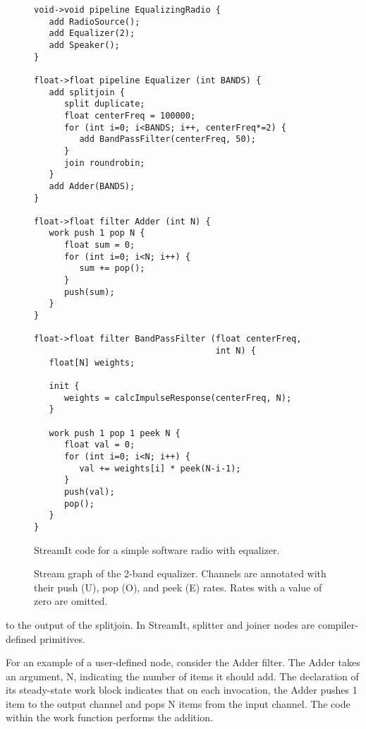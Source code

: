 \begin{figure}[h]
\scriptsize
\begin{minipage}{3in}
\vspace{6pt}
\begin{verbatim}
void->void pipeline EqualizingRadio {
   add RadioSource();
   add Equalizer(2);
   add Speaker();
}

float->float pipeline Equalizer (int BANDS) {
   add splitjoin {
      split duplicate;
      float centerFreq = 100000;
      for (int i=0; i<BANDS; i++, centerFreq*=2) {
         add BandPassFilter(centerFreq, 50);
      }
      join roundrobin;
   }
   add Adder(BANDS);
}

float->float filter Adder (int N) {
   work push 1 pop N {
      float sum = 0;
      for (int i=0; i<N; i++) {
         sum += pop();
      }
      push(sum);
   }
}

float->float filter BandPassFilter (float centerFreq, 
                                    int N) {
   float[N] weights;

   init {
      weights = calcImpulseResponse(centerFreq, N);
   }

   work push 1 pop 1 peek N {
      float val = 0;
      for (int i=0; i<N; i++) {
         val += weights[i] * peek(N-i-1);
      }
      push(val);
      pop();
   }
}
\end{verbatim}
\vspace{-6pt}
\parbox{2.7in}{\caption{StreamIt code for a simple software radio with equalizer.
\protect\label{fig:eq-code}}}
\end{minipage}
\hspace{0.3in}
\begin{minipage}{3.2in}
\vspace{12pt}
\caption{Stream graph of the 2-band equalizer.  Channels are annotated
with their push (U), pop (O), and peek (E) rates.  Rates with a value
of zero are omitted. \protect\label{fig:eq-graph}}
\end{minipage}
\end{figure}

\clearpage \noindent 
to the output of the splitjoin.  In StreamIt, splitter and joiner
nodes are compiler-defined primitives.

For an example of a user-defined node, consider the Adder filter.  The
Adder takes an argument, N, indicating the number of items it should
add.  The declaration of its steady-state work block indicates that on
each invocation, the Adder pushes 1 item to the output channel and
pops N items from the input channel.  The code within the work
function performs the addition.

